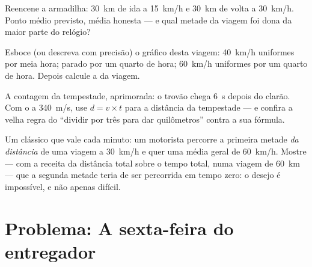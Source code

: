 \begin{exercise}[$\star\star$]\label{exo:g7:motion-average-speed:9}
Reencene a armadilha: \qty{30}{km} de ida a \qty{15}{km/h} e
\qty{30}{km} de volta a \qty{30}{km/h}. Ponto médio previsto, média
honesta --- e qual metade da viagem foi dona da maior parte do
relógio?
\end{exercise}

\begin{exercise}[$\star\star$]\label{exo:g7:motion-average-speed:10}
Esboce (ou descreva com precisão) o gráfico desta viagem:
\qty{40}{km/h} uniformes por meia hora; parado por um quarto de hora;
\qty{60}{km/h} uniformes por um quarto de hora. Depois calcule a
 da viagem.
\end{exercise}

\begin{exercise}[$\star\star$]\label{exo:g7:motion-average-speed:11}
A contagem da tempestade, aprimorada: o trovão chega \qty{6}{s}
depois do clarão. Com o  a \qty{340}{m/s}, use $d = v \times t$
para a distância da tempestade --- e confira a velha regra do
``dividir por três para dar quilômetros'' contra a sua fórmula.
\end{exercise}

\begin{exercise}[$\star\star\star$]\label{exo:g7:motion-average-speed:12}
Um clássico que vale cada minuto: um motorista percorre a primeira
metade \emph{da distância} de uma viagem a \qty{30}{km/h} e quer uma
média geral de \qty{60}{km/h}. Mostre --- com a receita da distância
total sobre o tempo total, numa viagem de \qty{60}{km} --- que a
segunda metade teria de ser percorrida em tempo zero: o desejo é
impossível, e não apenas difícil.
\end{exercise}

\section{Problema: A sexta-feira do entregador}

